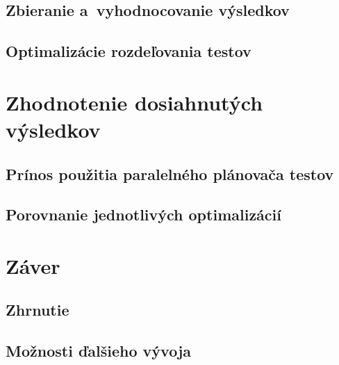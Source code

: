 \section{Zbieranie a~vyhodnocovanie výsledkov}
\section{Optimalizácie rozdeľovania testov}


\chapter{Zhodnotenie dosiahnutých výsledkov}
\section{Prínos použitia paralelného plánovača testov}
\section{Porovnanie jednotlivých optimalizácií}


\chapter{Záver}
\section{Zhrnutie}
\section{Možnosti ďalšieho vývoja}

